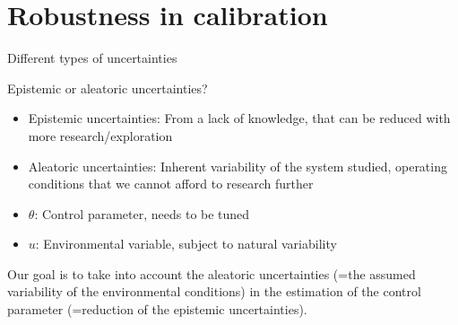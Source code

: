 \documentclass[10pt,aspectratio=169,usepdftitle=false]{beamer}
\newcommand{\kk}{\theta}
\newcommand{\uu}{u}
\begin{document}
\section{Robustness in calibration}
\begin{frame}{Different types of uncertainties}
  
  \begin{block}{Epistemic or aleatoric
      uncertainties?~\citep{walker_defining_2003}}
    \begin{itemize}
    \item Epistemic uncertainties: From a lack of knowledge, that can
      be reduced with more research/exploration
    \item Aleatoric uncertainties: Inherent variability of the system
      studied, operating conditions that we cannot afford to research further
    \end{itemize}
  \end{block}

  \begin{itemize}
  \item $\kk$: Control parameter, needs to be tuned
  \item $\uu$: Environmental variable, subject to natural variability
  \end{itemize}
  
  Our goal is to take into account the aleatoric uncertainties (=the
  assumed variability of the environmental conditions) in the
  estimation of the control parameter (=reduction of the epistemic uncertainties).
\end{frame}
\end{document}
